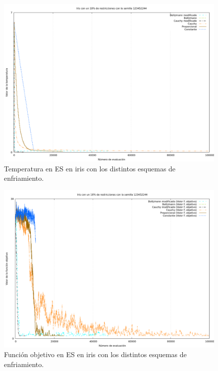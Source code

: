 \documentclass[12pt, spanish]{article}
\begin{document}
\begin{figure}[H]
	\centering
	\includegraphics[scale = 0.3]{cmp-tmp/iris-temp.png}
	
	\caption{Temperatura en ES en iris con los distintos esquemas de enfriamiento.}
	\label{fig:es-cmp2}
\end{figure}

\begin{figure}[H]
	\centering
	\includegraphics[scale = 0.3]{cmp-tmp/iris-es.png}
	
	\caption{Función objetivo en ES en iris con los distintos esquemas de enfriamiento.}
	\label{fig:es-cmp1}
\end{figure}
\end{document}
